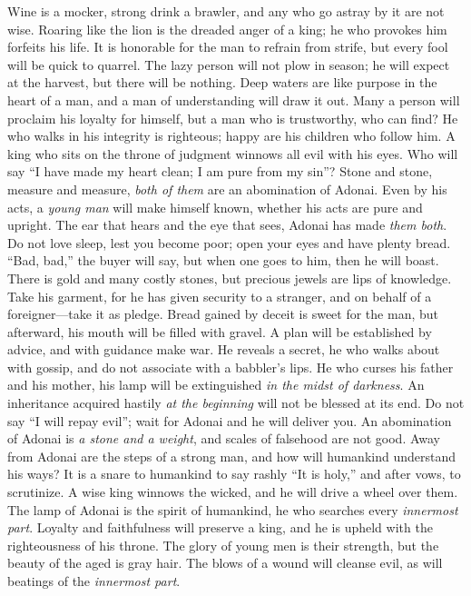 \begin{biblechapter} %
\verse Wine is a mocker, strong drink a brawler, 
and any who go astray by it are not wise.
\verse Roaring like the lion is the dreaded anger of a king; 
he who provokes him forfeits his life.
\verse It is honorable for the man to refrain from strife, 
but every fool will be quick to quarrel.
\verse The lazy person will not plow in season; 
he will expect at the harvest, but there will be nothing.
\verse Deep waters are like purpose in the heart of a man, 
and a man of understanding will draw it out.
\verse Many a person will proclaim his loyalty for himself, 
but a man who is trustworthy, who can find?
\verse He who walks in his integrity is righteous; 
happy are his children who follow him.
\verse A king who sits on the throne of judgment 
winnows all evil with his eyes.
\verse Who will say “I have made my heart clean; 
I am pure from my sin”?
\verse Stone and stone, measure and measure, 
\textit{both of them} are an abomination of Adonai.
\verse Even by his acts, a \textit{young man} will make himself known, 
whether his acts are pure and upright.
\verse The ear that hears and the eye that sees, 
Adonai has made \textit{them both}.
\verse Do not love sleep, lest you become poor; 
open your eyes and have plenty bread.
\verse “Bad, bad,” the buyer will say, 
but when one goes to him, then he will boast.
\verse There is gold and many costly stones, 
but precious jewels are lips of knowledge.
\verse Take his garment, for he has given security to a stranger, 
and on behalf of a foreigner—take it as pledge.
\verse Bread gained by deceit is sweet for the man, 
but afterward, his mouth will be filled with gravel.
\verse A plan will be established by advice, 
and with guidance make war.
\verse He reveals a secret, he who walks about with gossip, 
and do not associate with a babbler’s lips.
\verse He who curses his father and his mother, 
his lamp will be extinguished \textit{in the midst of darkness}.
\verse An inheritance acquired hastily \textit{at the beginning} 
will not be blessed at its end.
\verse Do not say “I will repay evil”; 
wait for Adonai and he will deliver you.
\verse An abomination of Adonai is \textit{a stone and a weight}, 
and scales of falsehood are not good.
\verse Away from Adonai are the steps of a strong man, 
and how will humankind understand his ways?
\verse It is a snare to humankind to say rashly “It is holy,” 
and after vows, to scrutinize.
\verse A wise king winnows the wicked, 
and he will drive a wheel over them.
\verse The lamp of Adonai is the spirit of humankind, 
he who searches every \textit{innermost part}.
\verse Loyalty and faithfulness will preserve a king, 
and he is upheld with the righteousness of his throne.
\verse The glory of young men is their strength, 
but the beauty of the aged is gray hair.
\verse The blows of a wound will cleanse evil, 
as will beatings of the \textit{innermost part}.
\end{biblechapter}

